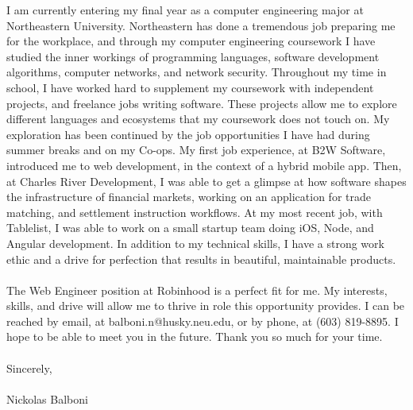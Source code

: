 \documentclass[]{resume}
\begin{document}
I am currently entering my final year as a computer engineering major at Northeastern University.  Northeastern has done a tremendous job preparing me for the workplace, and through my computer engineering coursework I have studied the inner workings of programming languages, software development algorithms, computer networks, and network security.  Throughout my time in school, I have worked hard to supplement my coursework with independent projects, and freelance jobs writing software.  These projects allow me to explore different languages and ecosystems that my coursework does not touch on.  My exploration has been continued by the job opportunities I have had during summer breaks and on my Co-ops.  My first job experience, at B2W Software, introduced me to web development, in the context of a hybrid mobile app.  Then, at Charles River Development, I was able to get a glimpse at how software shapes the infrastructure of financial markets, working on an application for trade matching, and settlement instruction workflows.  At my most recent job, with Tablelist, I was able to work on a small startup team doing iOS, Node, and Angular development.  In addition to my technical skills, I have a strong work ethic and a drive for perfection that results in beautiful, maintainable products.  \\
\\

The Web Engineer position at Robinhood is a perfect fit for me.  My interests, skills, and drive will allow me to thrive in role this opportunity provides.  I can be reached by email, at balboni.n@husky.neu.edu, or by phone, at (603) 819-8895.  I hope to be able to meet you in the future.  Thank you so much for your time.  \\
\\[1.5cm]
Sincerely,  \\
\\[1cm]
Nickolas Balboni \\
\\[2cm]
\vspace*{\fill}  %
\newpage
\end{document}
